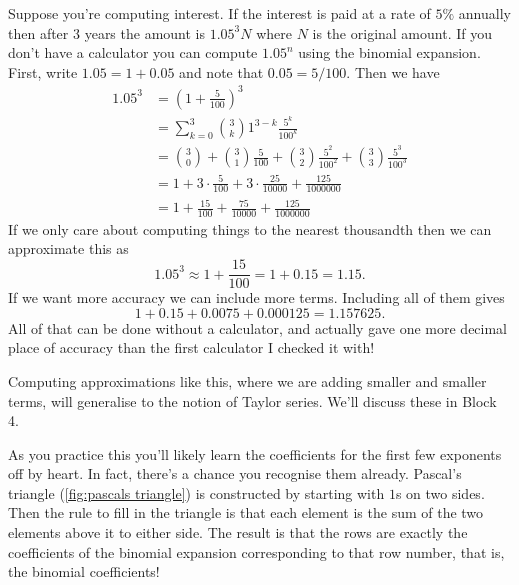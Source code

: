 \documentclass[fleqn]{LectureClass/LectureClass}
\begin{document}
    \begin{exm}{}{}
        Suppose you're computing interest.
        If the interest is paid at a rate of \(5\%\) annually then after \(3\) years the amount is \(1.05^3N\) where \(N\) is the original amount.
        If you don't have a calculator you can compute \(1.05^n\) using the binomial expansion.
        First, write \(1.05 = 1 + 0.05\) and note that \(0.05 = 5/100\).
        Then we have
        \begin{align}
            1.05^3 &= \left( 1 + \frac{5}{100} \right)^3\\
            &= \sum_{k=0}^{3} \binom{3}{k} 1^{3 - k} \frac{5^k}{100^k}\\
            &= \binom{3}{0} + \binom{3}{1} \frac{5}{100} + \binom{3}{2} \frac{5^2}{100^2} + \binom{3}{3} \frac{5^3}{100^3}\\
            &= 1 + 3 \cdot \frac{5}{100} + 3 \cdot \frac{25}{10000} + \frac{125}{1000000}\\
            &= 1 + \frac{15}{100} + \frac{75}{10000} + \frac{125}{1000000}
        \end{align}
        If we only care about computing things to the nearest thousandth then we can approximate this as
        \begin{equation}
            1.05^3 \approx 1 + \frac{15}{100} = 1 + 0.15 = 1.15.
        \end{equation}
        If we want more accuracy we can include more terms.
        Including all of them gives
        \begin{equation}
            1 + 0.15 + 0.0075 + 0.000125 = 1.157625.
        \end{equation}
        All of that can be done without a calculator, and actually gave one more decimal place of accuracy than the first calculator I checked it with!
    \end{exm}
     
    \begin{remark}{}{}
        Computing approximations like this, where we are adding smaller and smaller terms, will generalise to the notion of Taylor series.
        We'll discuss these in Block 4.
    \end{remark}
     
    As you practice this you'll likely learn the coefficients for the first few exponents off by heart.
    In fact, there's a chance you recognise them already.
    Pascal's triangle (\cref{fig:pascals triangle}) is constructed by starting with \(1\)s on two sides.
    Then the rule to fill in the triangle is that each element is the sum of the two elements above it to either side.
    The result is that the rows are exactly the coefficients of the binomial expansion corresponding to that row number, that is, the binomial coefficients!
     
\end{document}
